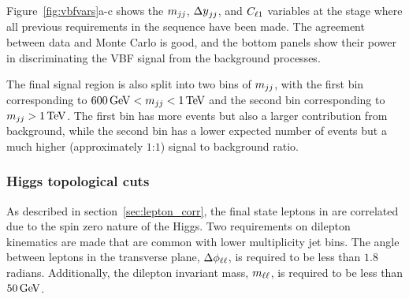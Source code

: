 Figure~\ref{fig:vbfvars}a-c shows the $m_{jj}$, $\dyjj$, and $C_{\ell1}$ variables at the stage where all previous requirements in the sequence have been made. The agreement between data and Monte Carlo is good, and the bottom panels show their power in discriminating the VBF signal from the background processes. 

The final signal region is also split into two bins of $m_{jj}$, with the first bin corresponding to $600 \GeV < \mjj < 1 \TeV$ and the second bin corresponding to $\mjj > 1 \TeV$. The first bin has more events but also a larger contribution from background, while the second bin has a lower expected number of events but a much higher (approximately $1$:$1$) signal to background ratio. 

\subsubsection{Higgs topological cuts}

As described in section~\ref{sec:lepton_corr}, the final state leptons in \HWWfull are correlated due to the spin zero nature of the Higgs. Two requirements on dilepton kinematics are made that are common with lower multiplicity jet bins. The angle between leptons in the transverse plane, $\Delta\phi_{\ell\ell}$, is required to be less than $1.8$ radians. Additionally, the dilepton invariant mass, $m_{\ell\ell}$, is required to be less than $50 \GeV$. 


